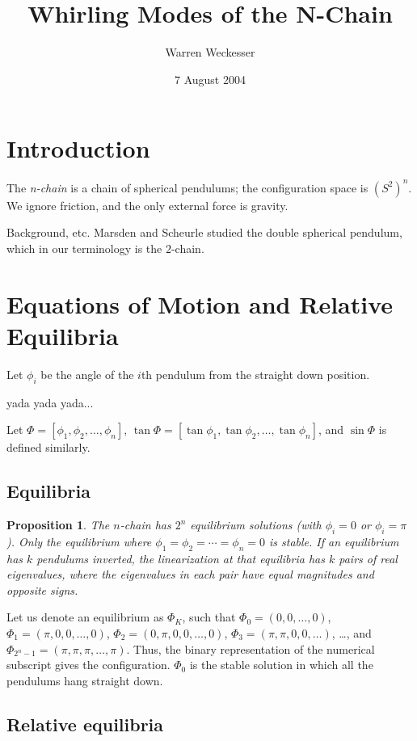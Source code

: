 \documentclass[11pt]{amsart}
\title{Whirling Modes of the N-Chain}
\author{Warren Weckesser}
\date{7 August 2004}
\newtheorem{prop}{Proposition}
\begin{document}
\maketitle
\section{Introduction}
The \emph{n-chain} is a chain of spherical pendulums; the configuration
space is $(S^2)^{n}$.
We ignore friction, and
the only external force is gravity.

Background, etc.
Marsden and Scheurle \cite{MS} studied the double spherical pendulum, which in our terminology
is the $2$-chain.

\section{Equations of Motion and Relative Equilibria}

Let $\phi_i$ be the angle of the $i$th pendulum from the straight down position.

yada yada yada...



Let $\Phi = [\phi_1, \phi_2, \ldots, \phi_n]$,
$\tan\Phi = [\tan\phi_1, \tan\phi_2, \ldots, \tan\phi_n]$,
and $\sin\Phi$ is defined similarly.

\subsection{Equilibria}
\begin{prop}
The $n$-chain has $2^n$ equilibrium solutions
(with $\phi_i=0$ or $\phi_i = \pi$).
Only the equilibrium where $\phi_1 = \phi_2 = \cdots = \phi_n = 0$ is stable.
If an equilibrium has $k$ pendulums inverted, the linearization at that
equilibria has $k$ pairs of real eigenvalues, where the eigenvalues in each
pair have equal magnitudes and opposite signs.
\end{prop}
Let us denote an equilibrium as $\Phi_K$, such that
$\Phi_0 = (0,0,\ldots,0)$,
$\Phi_1 = (\pi,0,0,\ldots,0)$,
$\Phi_2 = (0,\pi,0,0,\ldots,0)$,
$\Phi_3 = (\pi,\pi,0,0,\ldots)$,
\ldots, and
$\Phi_{2^n-1} = (\pi,\pi,\pi,\ldots,\pi)$.
Thus, the binary representation of the numerical subscript
gives the configuration.  $\Phi_0$ is the stable solution in which all the
pendulums hang straight down.

\subsection{Relative equilibria}
\end{document}

